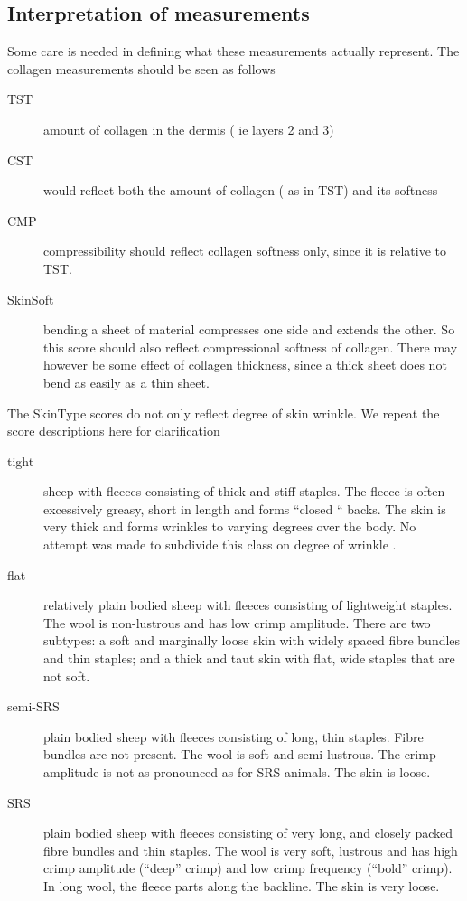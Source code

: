 \documentclass[titlepage]{article}  %
\begin{document}
\subsection{Interpretation of measurements}
Some care is needed in defining what these measurements actually represent. The collagen measurements should be seen as follows
\begin{description}
\item[TST] amount of collagen in the dermis ( ie layers 2 and 3)
\item[CST] would reflect both the amount of collagen ( as in TST) and its softness
\item[CMP] compressibility should reflect collagen softness only, since it is relative to TST.
\item[SkinSoft] bending a sheet of material compresses one side and extends the other. So this score should also reflect compressional softness of collagen. There may however be some effect of collagen thickness, since a thick sheet does not bend as easily as a thin sheet.
\end{description}

The SkinType scores do not only reflect degree of skin wrinkle. We repeat the score descriptions here for clarification

\begin{description}
\item [tight] sheep with fleeces consisting of thick and stiff staples. The fleece is often excessively greasy, short in length and forms “closed “ backs.  The skin is very thick and forms wrinkles to varying degrees over the body.  No attempt was made to subdivide this class on degree of wrinkle .
\item[flat] relatively plain bodied sheep with fleeces consisting of lightweight staples. The wool is non-lustrous and has low crimp amplitude. There are two subtypes: a soft and marginally loose skin with widely spaced fibre bundles and thin staples; and a thick and taut skin with flat, wide staples that are not soft. 
\item[semi-SRS] plain bodied sheep with fleeces consisting of long, thin staples. Fibre bundles are not present. The wool is soft and semi-lustrous. The crimp amplitude is not as pronounced as for SRS animals. The skin is loose.
\item[SRS] plain bodied sheep with fleeces consisting of very long, and closely packed  fibre bundles and thin staples. The wool is very soft, lustrous and has high crimp amplitude (“deep” crimp) and low crimp frequency (“bold” crimp). In long wool, the fleece parts along the backline. The skin is very loose.
\end{description}
\end{document}
